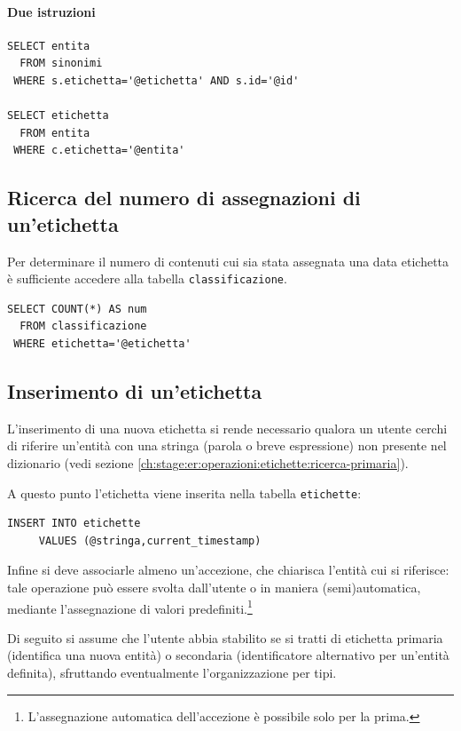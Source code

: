\documentclass[10pt,a4paper,headinclude,footinclude,hidelinks]{scrreprt} %
\begin{document}
\paragraph{Due istruzioni}
\begin{verbatim}
SELECT entita
  FROM sinonimi	
 WHERE s.etichetta='@etichetta' AND s.id='@id'

SELECT etichetta
  FROM entita	
 WHERE c.etichetta='@entita'
\end{verbatim}

	\subsection{Ricerca del numero di assegnazioni di un'etichetta}
	\label{ch:stage:er:operazioni:etichette:occorrenze}
	Per determinare il numero di contenuti cui sia stata assegnata una data etichetta è sufficiente accedere alla tabella \texttt{classificazione}.

\begin{verbatim}
SELECT COUNT(*) AS num
  FROM classificazione
 WHERE etichetta='@etichetta'
\end{verbatim}

	\subsection{Inserimento di un'etichetta}
	\label{ch:stage:er:operazioni:etichette:inserimento}
	L'inserimento di una nuova etichetta si rende necessario qualora un utente cerchi di riferire un'entità con una stringa (parola o breve espressione) non presente nel dizionario (vedi sezione \ref{ch:stage:er:operazioni:etichette:ricerca-primaria}).

	A questo punto l'etichetta viene inserita nella tabella \texttt{etichette}:
\begin{verbatim}
INSERT INTO etichette
     VALUES (@stringa,current_timestamp)
\end{verbatim}

	Infine si deve associarle almeno un'accezione, che chiarisca l'entità cui si riferisce: tale operazione può essere svolta dall'utente o in maniera (semi)automatica, mediante l'assegnazione di valori predefiniti.\footnote{L'assegnazione automatica dell'accezione è possibile solo per la prima.}

	Di seguito si assume che l'utente abbia stabilito se si tratti di etichetta primaria (identifica una nuova entità) o secondaria (identificatore alternativo per un'entità definita), sfruttando eventualmente l'organizzazione per tipi.
\end{document}
